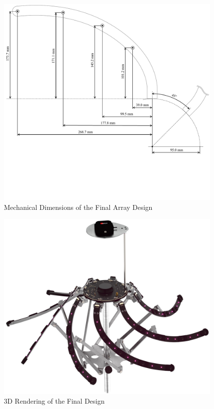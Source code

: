 \begin{figure}[h]
	\centering
	\includegraphics[width=1.0\textwidth, trim={0 4.9cm 0 0}]{images/6_design_final/array_final_design_mechanical_dimensions.pdf}
	\caption{Mechanical Dimensions of the Final Array Design}
	\label{fig:array_final_design_mechanical_dimensions}
\end{figure}

\newpage


\begin{figure}[h]
	\centering
	\includegraphics[width=1.0\textwidth]{images/6_design_final/final_design_3d_rendering.jpg}
	\caption{3D Rendering of the Final Design}
	\label{fig:final_design_3d_rendering}
\end{figure}


